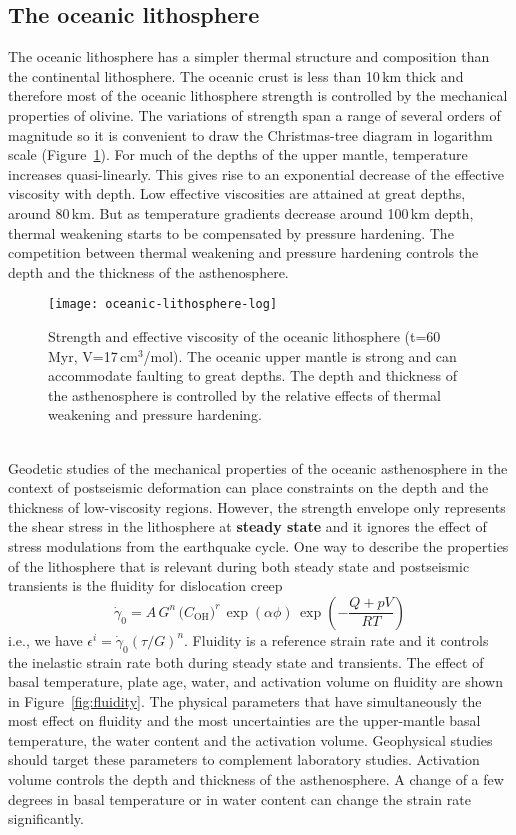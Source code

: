 \documentclass[letterpaper,12pt,]{memoir}
\begin{document}
\clearpage
\subsection{The oceanic lithosphere}

The oceanic lithosphere has a simpler thermal structure and composition than the continental lithosphere. The oceanic crust is less than 10\,km thick and therefore most of the oceanic lithosphere strength is controlled by the mechanical properties of olivine. The variations of strength span a range of several orders of magnitude so it is convenient to draw the Christmas-tree diagram in logarithm scale (Figure~\ref{fig:asthenosphere}). For much of the depths of the upper mantle, temperature increases quasi-linearly. This gives rise to an exponential decrease of the effective viscosity with depth. Low effective viscosities are attained at great depths, around 80\,km. But as temperature gradients decrease around 100\,km depth, thermal weakening starts to be compensated by pressure hardening. The competition between thermal weakening and pressure hardening controls the depth and the thickness of the asthenosphere. \\
\begin{figure}[h]
\centering
\texttt{[image: oceanic-lithosphere-log]}
\caption{Strength and effective viscosity of the oceanic lithosphere (t=60\,Myr, V=17\,cm$^3$/mol). The oceanic upper mantle is strong and can accommodate faulting to great depths. The depth and thickness of the asthenosphere is controlled by the relative effects of thermal weakening and pressure hardening.}
\label{fig:asthenosphere}
\end{figure}
%
\\
Geodetic studies of the mechanical properties of the oceanic asthenosphere in the context of postseismic deformation can place constraints on the depth and the thickness of low-viscosity regions. However, the strength envelope only represents the shear stress in the lithosphere at \textbf{steady state} and it ignores the effect of stress modulations from the earthquake cycle. One way to describe the properties of the lithosphere that is relevant during both steady state and postseismic transients is the fluidity for dislocation creep
\begin{equation}
\dot{\gamma}_0=A\,G^{n}\,\big(C_\text{OH}\big)^r\,\exp\left(\alpha\phi\right)\,\exp\left(-\frac{Q+pV}{RT}\right)
\end{equation}
i.e., we have $\epsilon^i=\dot{\gamma}_0\left(\tau/G\right)^n$. Fluidity is a reference strain rate and it controls the inelastic strain rate both during steady state and transients. The effect of basal temperature, plate age, water, and activation volume on fluidity are shown in Figure~\ref{fig:fluidity}. The physical parameters that have simultaneously the most effect on fluidity and the most uncertainties are the upper-mantle basal temperature, the water content and the activation volume. Geophysical studies should target these parameters to complement laboratory studies. Activation volume controls the depth and thickness of the asthenosphere. A change of a few degrees in basal temperature or in water content can change the strain rate significantly.\\
\end{document}
